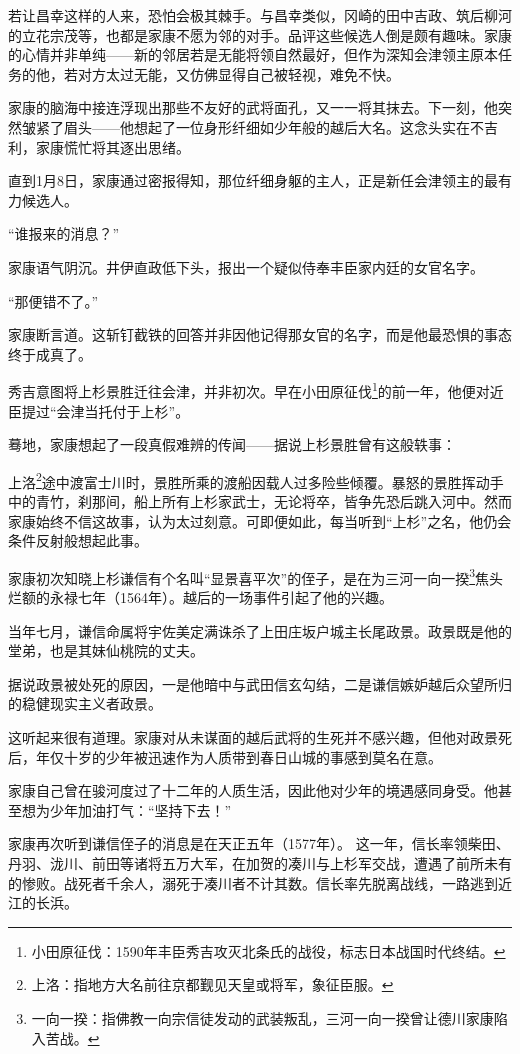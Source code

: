 \documentclass[
]{book}
\begin{document}
若让昌幸这样的人来，恐怕会极其棘手。与昌幸类似，冈崎的田中吉政、筑后柳河的立花宗茂等，也都是家康不愿为邻的对手。品评这些候选人倒是颇有趣味。家康的心情并非单纯------新的邻居若是无能将领自然最好，但作为深知会津领主原本任务的他，若对方太过无能，又仿佛显得自己被轻视，难免不快。

家康的脑海中接连浮现出那些不友好的武将面孔，又一一将其抹去。下一刻，他突然皱紧了眉头------他想起了一位身形纤细如少年般的越后大名。这念头实在不吉利，家康慌忙将其逐出思绪。

直到1月8日，家康通过密报得知，那位纤细身躯的主人，正是新任会津领主的最有力候选人。

``谁报来的消息？''

家康语气阴沉。井伊直政低下头，报出一个疑似侍奉丰臣家内廷的女官名字。

``那便错不了。''

家康断言道。这斩钉截铁的回答并非因他记得那女官的名字，而是他最恐惧的事态终于成真了。

秀吉意图将上杉景胜迁往会津，并非初次。早在小田原征伐\footnote{小田原征伐：1590年丰臣秀吉攻灭北条氏的战役，标志日本战国时代终结。}的前一年，他便对近臣提过``会津当托付于上杉''。

蓦地，家康想起了一段真假难辨的传闻------据说上杉景胜曾有这般轶事：

上洛\footnote{上洛：指地方大名前往京都觐见天皇或将军，象征臣服。}途中渡富士川时，景胜所乘的渡船因载人过多险些倾覆。暴怒的景胜挥动手中的青竹，刹那间，船上所有上杉家武士，无论将卒，皆争先恐后跳入河中。然而家康始终不信这故事，认为太过刻意。可即便如此，每当听到``上杉''之名，他仍会条件反射般想起此事。

家康初次知晓上杉谦信有个名叫``显景喜平次''的侄子，是在为三河一向一揆\footnote{一向一揆：指佛教一向宗信徒发动的武装叛乱，三河一向一揆曾让德川家康陷入苦战。}焦头烂额的永禄七年（1564年）。越后的一场事件引起了他的兴趣。

当年七月，谦信命属将宇佐美定满诛杀了上田庄坂户城主长尾政景。政景既是他的堂弟，也是其妹仙桃院的丈夫。

据说政景被处死的原因，一是他暗中与武田信玄勾结，二是谦信嫉妒越后众望所归的稳健现实主义者政景。

这听起来很有道理。家康对从未谋面的越后武将的生死并不感兴趣，但他对政景死后，年仅十岁的少年被迅速作为人质带到春日山城的事感到莫名在意。

家康自己曾在骏河度过了十二年的人质生活，因此他对少年的境遇感同身受。他甚至想为少年加油打气：``坚持下去！''

家康再次听到谦信侄子的消息是在天正五年（1577年）。
这一年，信长率领柴田、丹羽、泷川、前田等诸将五万大军，在加贺的凑川与上杉军交战，遭遇了前所未有的惨败。战死者千余人，溺死于凑川者不计其数。信长率先脱离战线，一路逃到近江的长浜。
\end{document}
